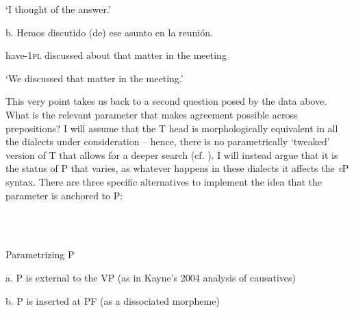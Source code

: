 \documentclass[output=paper]{langsci/langscibook}
\begin{document}
\begin{styleHTMLPreformatted}
        ‘I thought of the answer.’
\end{styleHTMLPreformatted}

\begin{styleHTMLPreformatted}
  b.   Hemos      discutido  (de)     ese  asunto  en  la   reunión.  
\end{styleHTMLPreformatted}

\begin{styleHTMLPreformatted}
        have{}-\textsc{1pl}  discussed  about  that  matter  in  the meeting
\end{styleHTMLPreformatted}

\begin{styleHTMLPreformatted}
        ‘We discussed that matter in the meeting.’
\end{styleHTMLPreformatted}

\begin{styleHTMLPreformatted}
This very point takes us back to a second question posed by the data above. What is the relevant parameter that makes agreement possible across prepositions? I will assume that the T head is morphologically equivalent in all the  dialects under consideration – hence, there is no parametrically ‘tweaked’ version of T that allows for a deeper search (cf. \citealt{Chomsky2001}). I will instead argue that it is the status of P that varies, as whatever happens in these dialects it affects the \textit{v}P syntax. There are three specific alternatives to implement the idea that the parameter is anchored to P:
\end{styleHTMLPreformatted}

\begin{styleHTMLPreformatted}
\ea%
    \label{ex:key:33}
    \gll\\
        \\
    \glt
    \z

          Parametrizing P
\end{styleHTMLPreformatted}

\begin{styleHTMLPreformatted}
  a.   P is external to the VP (as in Kayne’s 2004 analysis of causatives)
\end{styleHTMLPreformatted}

\begin{styleHTMLPreformatted}
  b.   P is inserted at PF (as a dissociated morpheme)
\end{styleHTMLPreformatted}
\end{document}
